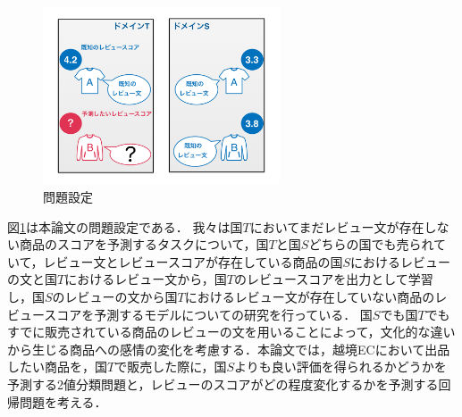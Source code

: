 \documentclass[dvipdfmx,twocolumn,10.5pt]{jsarticle}
\begin{document}
\begin{figure}[tb]
	\centering
	\includegraphics[width=7cm]{images/problem_setting.pdf} 
	\caption{問題設定}
	\label{problem_setting}
\end{figure}

図\ref{problem_setting}は本論文の問題設定である．
我々は国$T$においてまだレビュー文が存在しない商品のスコアを予測するタスクについて，国$T$と国$S$どちらの国でも売られていて，レビュー文とレビュースコアが存在している商品の国$S$におけるレビューの文と国$T$におけるレビュー文から，国$T$のレビュースコアを出力として学習し，国$S$のレビューの文から国$T$におけるレビュー文が存在していない商品のレビュースコアを予測するモデルについての研究を行っている．
国$S$でも国$T$でもすでに販売されている商品のレビューの文を用いることによって，文化的な違いから生じる商品への感情の変化を考慮する．本論文では，越境ECにおいて出品したい商品を，国$T$で販売した際に，国$S$よりも良い評価を得られるかどうかを予測する2値分類問題と，レビューのスコアがどの程度変化するかを予測する回帰問題を考える．
\end{document}
